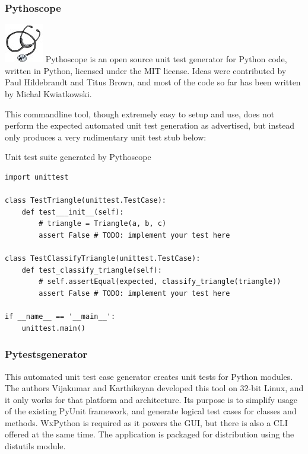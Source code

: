 \documentclass{icldt}
\numberwithin{equation}{section}       %
\begin{document}
{\subsubsection{\textsf{Pythoscope}}
\includegraphics[scale=.5]{img/pythoscope-logo.jpg} \textsf{Pythoscope} is an open source unit test generator for Python code, written in Python, licensed under the MIT license. Ideas were contributed by Paul Hildebrandt and Titus Brown, and most of the code so far has been written by Michal Kwiatkowski.

This commandline tool, though extremely easy to setup and use, does not perform the expected automated unit test generation as advertised, but instead only produces a very rudimentary unit test stub below:

\begin{listing}[H]
	\caption{Unit test suite generated by \textsf{Pythoscope}}
	\begin{verbatim}
import unittest

class TestTriangle(unittest.TestCase):
    def test___init__(self):
        # triangle = Triangle(a, b, c)
        assert False # TODO: implement your test here

class TestClassifyTriangle(unittest.TestCase):
    def test_classify_triangle(self):
        # self.assertEqual(expected, classify_triangle(triangle))
        assert False # TODO: implement your test here

if __name__ == '__main__':
    unittest.main()
	\end{verbatim}
	\label{lst:py-triangle-pythoscope}
\end{listing}

\subsubsection{Pytestsgenerator}
This automated unit test case generator creates unit tests for Python modules. The authors Vijakumar and Karthikeyan developed this tool on 32-bit Linux, and it only works for that platform and architecture. Its purpose is to simplify usage of the existing \textsf{PyUnit} framework, and generate logical test cases for classes and methods. \textsf{WxPython} is required as it powers the GUI, but there is also a CLI offered at the same time. The application is packaged for distribution using the \textsf{distutils} module.

}
\end{document}
